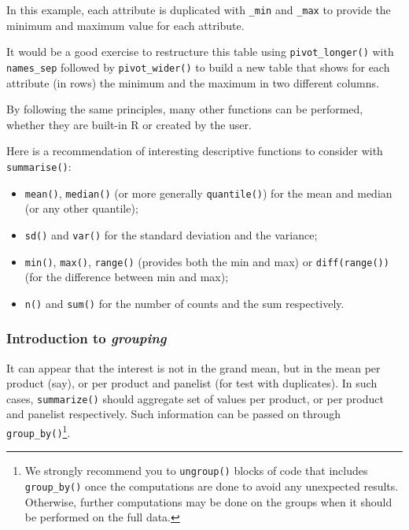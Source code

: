 \documentclass[
]{krantz}
\providecommand{\tightlist}{%
  \setlength{\itemsep}{0pt}\setlength{\parskip}{0pt}}
\renewenvironment{quote}{\begin{VF}}{\end{VF}}
\begin{document}
In this example, each attribute is duplicated with \texttt{\_min} and \texttt{\_max} to provide the minimum and maximum value for each attribute.

\begin{quote}
It would be a good exercise to restructure this table using \texttt{pivot\_longer()} with \texttt{names\_sep} followed by \texttt{pivot\_wider()} to build a new table that shows for each attribute (in rows) the minimum and the maximum in two different columns.
\end{quote}

By following the same principles, many other functions can be performed, whether they are built-in R or created by the user.

Here is a recommendation of interesting descriptive functions to consider with \texttt{summarise()}:

\begin{itemize}
\tightlist
\item
  \texttt{mean()}, \texttt{median()} (or more generally \texttt{quantile()}) for the mean and median (or any other quantile);
\item
  \texttt{sd()} and \texttt{var()} for the standard deviation and the variance;
\item
  \texttt{min()}, \texttt{max()}, \texttt{range()} (provides both the min and max) or \texttt{diff(range())} (for the difference between min and max);
\item
  \texttt{n()} and \texttt{sum()} for the number of counts and the sum respectively.
\end{itemize}

\hypertarget{introduction-to-grouping}{%
\subsubsection{\texorpdfstring{Introduction to \emph{grouping}}{Introduction to grouping}}\label{introduction-to-grouping}}

It can appear that the interest is not in the grand mean, but in the mean per product (say), or per product and panelist (for test with duplicates). In such cases, \texttt{summarize()} should aggregate set of values per product, or per product and panelist respectively. Such information can be passed on through \texttt{group\_by()}\footnote{We strongly recommend you to \texttt{ungroup()} blocks of code that includes \texttt{group\_by()} once the computations are done to avoid any unexpected results. Otherwise, further computations may be done on the groups when it should be performed on the full data.}.
\end{document}
